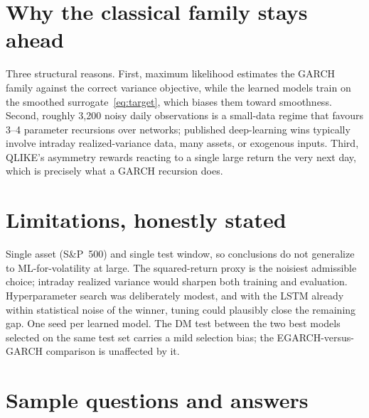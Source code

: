 \documentclass[a4paper,11pt]{article}
\begin{document}
\section{Why the classical family stays ahead}

Three structural reasons. First, maximum likelihood estimates the GARCH family against the correct variance objective, while the learned models train on the smoothed surrogate~\eqref{eq:target}, which biases them toward smoothness. Second, roughly 3{,}200 noisy daily observations is a small-data regime that favours 3--4 parameter recursions over networks; published deep-learning wins typically involve intraday realized-variance data, many assets, or exogenous inputs. Third, QLIKE's asymmetry rewards reacting to a single large return the very next day, which is precisely what a GARCH recursion does.

\section{Limitations, honestly stated}

Single asset (S\&P~500) and single test window, so conclusions do not generalize to ML-for-volatility at large. The squared-return proxy is the noisiest admissible choice; intraday realized variance would sharpen both training and evaluation. Hyperparameter search was deliberately modest, and with the LSTM already within statistical noise of the winner, tuning could plausibly close the remaining gap. One seed per learned model. The DM test between the two best models selected on the same test set carries a mild selection bias; the EGARCH-versus-GARCH comparison is unaffected by it.

\section{Sample questions and answers}
\end{document}
